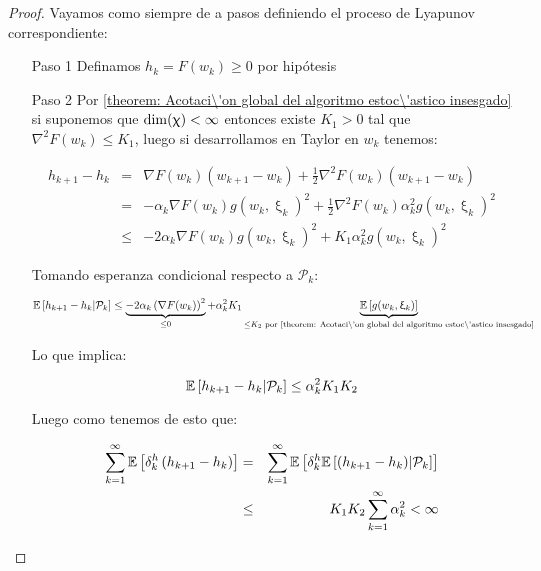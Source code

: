 \begin{proof}
	Vayamos como siempre de a pasos definiendo el proceso de Lyapunov correspondiente:
	
	\begin{enumerate}
		\item [Paso 1] Definamos $h_k = F(w_k) \geq 0$ por hip\'otesis
		\item[Paso 2] Por \ref{theorem: Acotaci\'on global del algoritmo estoc\'astico insesgado} si suponemos que $\dim(\upchi) < \infty$ entonces existe $K_1 > 0$ tal que $\nabla^2 F(w_k) \leq K_1$, luego si desarrollamos en Taylor en $w_k$ tenemos:
		
		\begin{equation*}
			\begin{aligned}
				h_{k+1} - h_k & = & \nabla F(w_k) \left(w_{k+1} - w_k\right) + \frac{1}{2} \nabla^2 F(w_k) \left(w_{k+1} - w_k\right) \\
				& = & - \alpha_k \nabla F(w_k) g(w_k, \upxi_{k})^2 + \frac{1}{2} \nabla^2 F(w_k)  \alpha_k^2 g(w_k, \upxi_{k})^2 \\
				& \leq & -2 \alpha_k \nabla F(w_k) g(w_k, \upxi_{k})^2 + K_1 \alpha_k^2 g(w_k, \upxi_{k})^2
			\end{aligned}
		\end{equation*}
		 
		Tomando esperanza condicional respecto a $\mathcal{P}_k$:
		
		\begin{equation}
			\label{eq: Acotacion de la sucesin en la iteracion}
			\mathbb{E} \left[{h_{k+1} - h_k} \vert \mathcal{P}_{k}\right] \leq \underbrace{-2 \alpha_k \left(\nabla F(w_k)\right)^2}_{\leq 0}  + \alpha_k^2 K_1 \underbrace{\mathbb{E} \left[g(w_k, \upxi_{k})\right]}_{\leq K_2 \text{ por  \ref{theorem: Acotaci\'on global del algoritmo estoc\'astico insesgado}}}
		\end{equation}
		
		Lo que implica:
		
		\begin{equation}
			\mathbb{E} \left[{h_{k+1} - h_k} \vert \mathcal{P}_{k}\right] \leq \alpha_k^2 K_1K_2
		\end{equation}
		 
		 Luego como tenemos de esto que:
		 
		 \begin{equation*}
		 \begin{aligned}
		 \sum\limits_{k=1}^{\infty} {\mathbb{E} \left[\delta_k^{h} \left(h_{k+1} - h_k\right)\right]} & = & \sum\limits_{k=1}^{\infty} {\mathbb{E} \left[\delta_k^{h} \mathbb{E} \left[{\left(h_{k+1} - h_k\right)} \vert \mathcal{P}_{k}\right]\right]} \\
		 & \leq & K_1K_2\sum\limits_{k=1}^{\infty} {\alpha_k^2} < \infty
		 \end{aligned}
		 \end{equation*}
		 

\end{enumerate}
\end{proof}
